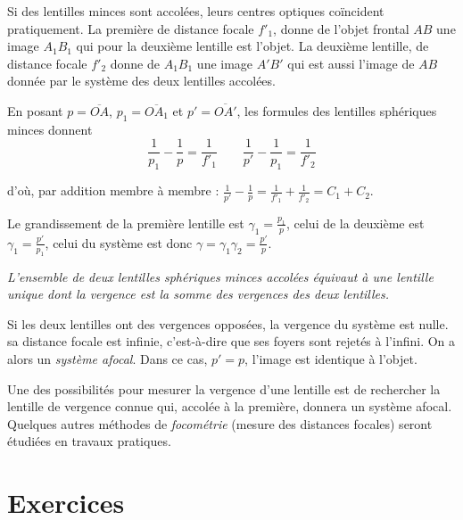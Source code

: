 Si des 	lentilles minces sont accolées, leurs centres optiques co\"incident pratiquement. La première de distance focale \(f'_1\), donne de l'objet frontal \(AB\) une image \(A_1B_1\) qui pour la deuxième lentille est l'objet. La deuxième lentille, de distance focale \(f'_2\) donne de \(A_1B_1\) une image \(A'B'\) qui est aussi l'image de \(AB\) donnée par le système des deux lentilles accolées.

En posant \(p = \overline{OA}\), \(p_1 = \overline{OA_1}\) et \(p' = \overline{OA'}\), les formules des lentilles sphériques minces donnent
\begin{equation}
  \frac{1}{p_1} - \frac{1}{p} = \frac{1}{f'_1} \qquad \frac{1}{p'} - \frac{1}{p_1} = \frac{1}{f'_2}
\end{equation}

d'où, par addition membre à membre : \(\frac{1}{p'} - \frac{1}{p} = \frac{1}{f'_1} + \frac{1}{f'_2} = C_1 + C_2\).

Le grandissement de la première lentille est \(\gamma_1 = \frac{p_1}{p}\), celui de la deuxième est \(\gamma_1 = \frac{p'}{p_1}\), celui du système est donc \(\gamma = \gamma_1 \gamma_2 = \frac{p'}{p}\).

\emph{L'ensemble de deux lentilles sphériques minces accolées équivaut à une lentille unique dont la vergence est la somme des vergences des deux lentilles.}

Si les deux lentilles ont des vergences opposées, la vergence du système est nulle. sa distance focale est infinie, c'est-à-dire que ses foyers sont rejetés à l'infini. On a alors un \emph{système afocal}. Dans ce cas, \(p' = p\), l'image est identique à l'objet.

Une des possibilités pour mesurer la vergence d'une lentille est de rechercher la lentille de vergence connue qui, accolée à la première, donnera un système afocal. Quelques autres méthodes de \emph{focométrie} (mesure des distances focales) seront étudiées en travaux pratiques.

\section{Exercices}
\label{chap8-sec:exercices}

